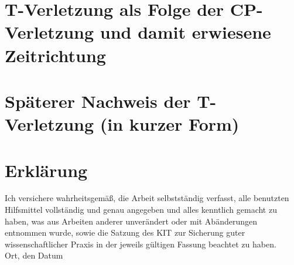 \documentclass[12pt,a4paper]{scrartcl}
\numberwithin{equation}{section}
\begin{document}
  \newpage  %

  \section{T-Verletzung als Folge der CP-Verletzung und damit erwiesene Zeitrichtung}

  \newpage  %

  \section{Späterer Nachweis der T-Verletzung (in kurzer Form)}

  \newpage

\begin{thebibliography}{Lam00}

\end{thebibliography}



\newpage

 \thispagestyle{empty}


\vspace*{8cm}


\section*{Erklärung}

Ich  versichere  wahrheitsgemäß,  die  Arbeit selbstständig verfasst,  alle  benutzten  Hilfsmittel  vollständig  und  genau  angegeben  und  alles kenntlich  gemacht  zu  haben,  was  aus  Arbeiten  anderer  unverändert  oder  mit  Abänderungen entnommen  wurde,  sowie die Satzung  des  KIT  zur  Sicherung guter wissenschaftlicher Praxis in der jeweils gültigen Fassung beachtet zu haben.
\\[2ex]

\noindent
Ort, den Datum\\[5ex]

\end{document}
